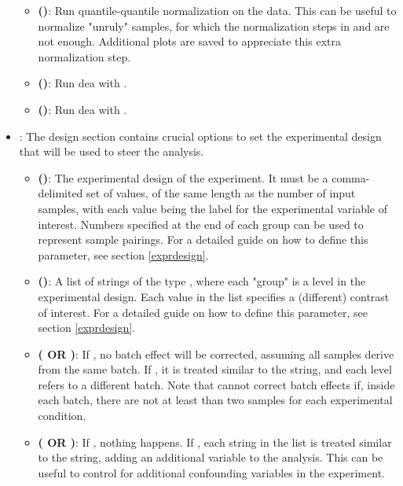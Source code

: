 \begin{itemize}
\begin{itemize}
        \item \textbf{ ()}: Run quantile-quantile normalization on the data. This can be useful to normalize "unruly" samples, for which the normalization steps in  and  are not enough. Additional plots are saved to appreciate this extra normalization step.
        \item \textbf{ ()}: Run \gls{dea} with .
        \item \textbf{ ()}: Run \gls{dea} with .
    \end{itemize}
    \item \textbf{}: The design section contains crucial options to set the experimental design that will be used to steer the analysis.
    \begin{itemize}
        \item \textbf{ ()}: The experimental design of the experiment. It must be a comma-delimited set of values, of the same length as the number of input samples, with each value being the label for the experimental variable of interest. Numbers specified at the end of each group can be used to represent sample pairings. For a detailed guide on how to define this parameter, see section \ref{exprdesign}.
        \item \textbf{ ()}: A list of strings of the type , where each "group" is a level in the experimental design. Each value in the list specifies a (different) contrast of interest. For a detailed guide on how to define this parameter, see section \ref{exprdesign}.
        \item \textbf{ ( OR )}: If , no batch effect will be corrected, assuming all samples derive from the same batch. If , it is treated similar to the  string, and each level refers to a different batch. Note that  cannot correct batch effects if, inside each batch, there are not at least than two samples for each experimental condition.
        \item \textbf{ ( OR )}: If , nothing happens. If , each string in the list is treated similar to the  string, adding an additional variable to the  analysis. This can be useful to control for additional confounding variables in the experiment.

\end{itemize}
\end{itemize}
